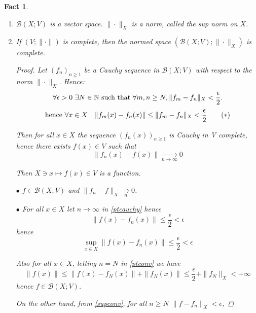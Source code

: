 \documentclass[12pt]{amsbook}
\newtheorem{fact}[theorem]{Fact}
\theoremstyle{definition}
\newcommand{\NN}{{\mathbb N}}
\newcommand{\cB}{{\mathcal B}}
\newcommand{\ra}{\rightarrow} %
\begin{document}
\begin{fact}
\begin{enumerate}
\item $\cB(X; V)$ is a vector space. $\|\cdot\|_X$ is a norm, called the \emph{sup norm} on $X$.
\item If $(V; \|\cdot\|)$ is complete, then the normed space $(\cB(X; V); \|\cdot\|_X)$ is complete.
\begin{proof}
Let $(f_n)_{n \geq 1}$ be a Cauchy sequence in $\cB(X; V)$ with respect to the norm $\|\cdot\|_X$. Hence:
\begin{equation*}
\forall \epsilon > 0 \ \exists N \in \NN \textup{ such that } \forall m, n \geq N, \|f_m - f_n\|_X < \frac{\epsilon}{2}.
\end{equation*}
\begin{equation}
\textup{hence } \forall x \in X \quad \|f_m(x) - f_n(x)\| \leq \|f_m - f_n\|_X < \frac{\epsilon}{2} \label{ptcauchy} \tag{$*$}
\end{equation}

Then for all $x \in X$ the sequence $(f_n(x))_{n \geq 1}$ is Cauchy in V complete, hence there exists $f(x) \in V$ such that
\begin{equation*} \|f_n(x) - f(x)\| \xrightarrow[n \ra \infty]{} 0 \end{equation*}

Then $X \ni x \mapsto f(x) \in V$ is a function. %

$\bullet$ $f \in \cB(X; V)$ and $\|f_n - f\|_X \xrightarrow[n]{} 0$.


$\bullet$ For all $x \in X$ let $n \ra \infty$ in \eqref{ptcauchy} hence
\begin{equation}
\|f(x) - f_n(x)\| \leq \frac{\epsilon}{2} < \epsilon \label{ptconv} \tag{$**$}
\end{equation}
hence
\begin{equation}
\sup_{x \in X} \|f(x) - f_n(x)\| \leq \frac{\epsilon}{2} < \epsilon \label{supconv} \tag{$***$}
\end{equation}

Also for all $x \in X$, letting $n = N$ in \eqref{ptconv} we have
\begin{equation*}
\|f(x)\| \leq \|f(x) - f_N(x)\| + \|f_N(x)\| \leq \frac{\epsilon}{2} + \|f_N\|_X < +\infty
\end{equation*}
hence $f \in \cB(X; V)$.

On the other hand, from \eqref{supconv}, for all $n \geq N$ $\|f - f_n\|_X < \epsilon$,


\end{proof}
\end{enumerate}
\end{fact}
\end{document}
